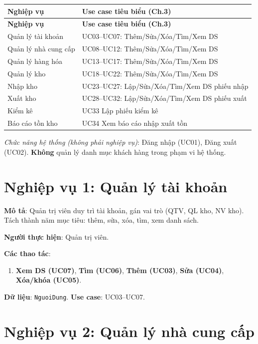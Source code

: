 \begin{longtable}{|p{4.2cm}|p{8.8cm}|}
\hline
\textbf{Nghiệp vụ} & \textbf{Use case tiêu biểu (Ch.3)} \\
\hline
\endfirsthead
\hline
\textbf{Nghiệp vụ} & \textbf{Use case tiêu biểu (Ch.3)} \\
\hline
\endhead
Quản lý tài khoản & UC03--UC07: Thêm/Sửa/Xóa/Tìm/Xem DS \\
\hline
Quản lý nhà cung cấp & UC08--UC12: Thêm/Sửa/Xóa/Tìm/Xem DS \\
\hline
Quản lý hàng hóa & UC13--UC17: Thêm/Sửa/Xóa/Tìm/Xem DS \\
\hline
Quản lý kho & UC18--UC22: Thêm/Sửa/Xóa/Tìm/Xem DS \\
\hline
Nhập kho & UC23--UC27: Lập/Sửa/Xóa/Tìm/Xem DS phiếu nhập \\
\hline
Xuất kho & UC28--UC32: Lập/Sửa/Xóa/Tìm/Xem DS phiếu xuất \\
\hline
Kiểm kê & UC33 Lập phiếu kiểm kê \\
\hline
Báo cáo tồn kho & UC34 Xem báo cáo nhập xuất tồn \\
\hline
\end{longtable}

\noindent\textit{Chức năng hệ thống (không phải nghiệp vụ)}: Đăng nhập (UC01), Đăng xuất (UC02). \textbf{Không} quản lý danh mục khách hàng trong phạm vi hệ thống.

\section{Nghiệp vụ 1: Quản lý tài khoản}

\textbf{Mô tả}: Quản trị viên duy trì tài khoản, gán vai trò (QTV, QL kho, NV kho). Tách thành năm mục tiêu: thêm, sửa, xóa, tìm, xem danh sách.

\textbf{Người thực hiện}: Quản trị viên.

\textbf{Các thao tác}:
\begin{enumerate}[leftmargin=1.5cm]
    \item \textbf{Xem DS (UC07)}, \textbf{Tìm (UC06)}, \textbf{Thêm (UC03)}, \textbf{Sửa (UC04)}, \textbf{Xóa/khóa (UC05)}.
\end{enumerate}

\textbf{Dữ liệu}: \texttt{NguoiDung}. \textbf{Use case}: UC03--UC07.

\section{Nghiệp vụ 2: Quản lý nhà cung cấp}

